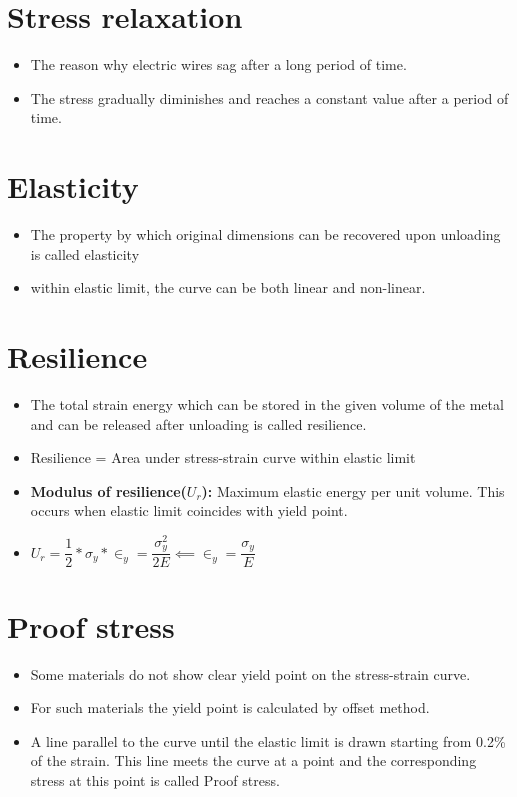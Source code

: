 \documentclass[8pt]{report}
\begin{document}
	\section{Stress relaxation}
		\begin{itemize}
			\item The reason why electric wires sag after a long period of time.
			\item The stress gradually diminishes and reaches a constant value after a period of time. 
		\end{itemize}\hrulefill
	\section{Elasticity}
		\begin{itemize}
			\item The property by which original dimensions can be recovered upon unloading is called elasticity
			\item within elastic limit, the curve can be both linear and non-linear.
		\end{itemize}\hrulefill
	\section{Resilience}
		\begin{itemize}
			\item The total strain energy which can be stored in the given volume of the metal and can be released after unloading is called resilience.
			\item Resilience = Area under stress-strain curve within elastic limit
			\item \textbf{Modulus of resilience($U_r$): }Maximum elastic energy per unit volume. This occurs when elastic limit coincides with yield point. 
			\item $\boxed{U_r= \dfrac{1}{2}*\sigma_y*\in_y=\dfrac{\sigma_y^2}{2E}}\impliedby \boxed{\in_y=\dfrac{\sigma_y}{E}}$			
	\end{itemize}\hrulefill
	\section{Proof stress}
		\begin{itemize}
			\item Some materials do not show clear yield point on the stress-strain curve. 
			\item For such materials the yield point is calculated by offset method. 
			\item A line parallel to the curve until the elastic limit is drawn starting from 0.2\% of the strain. This line meets the curve at a point and the corresponding stress at this point is called Proof stress.
		\end{itemize}\hrulefill		%
\end{document}
